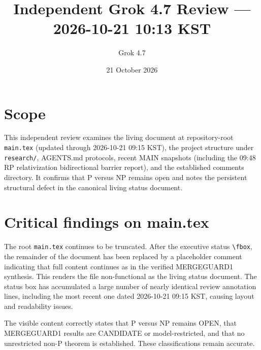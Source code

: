 \documentclass[11pt]{article}
\title{Independent Grok 4.7 Review --- 2026-10-21 10:13 KST}
\author{Grok 4.7}
\date{21 October 2026}
\begin{document}
\maketitle

\begin{center}
\end{center}

\section{Scope}
This independent review examines the living document at repository-root \texttt{main.tex} (updated through 2026-10-21 09:15 KST), the project structure under \texttt{research/}, AGENTS.md protocols, recent MAIN snapshots (including the 09:48 RP relativization bidirectional barrier report), and the established comments directory. It confirms that P versus NP remains open and notes the persistent structural defect in the canonical living status document.

\section{Critical findings on main.tex}
The root \texttt{main.tex} continues to be truncated. After the executive status \texttt{\textbackslash fbox}, the remainder of the document has been replaced by a placeholder comment indicating that full content continues as in the verified MERGEGUARD1 synthesis. This renders the file non-functional as the living status document. The status box has accumulated a large number of nearly identical review annotation lines, including the most recent one dated 2026-10-21 09:15 KST, causing layout and readability issues.

The visible content correctly states that P versus NP remains OPEN, that MERGEGUARD1 results are CANDIDATE or model-restricted, and that no unrestricted non-P theorem is established. These classifications remain accurate.
\end{document}
